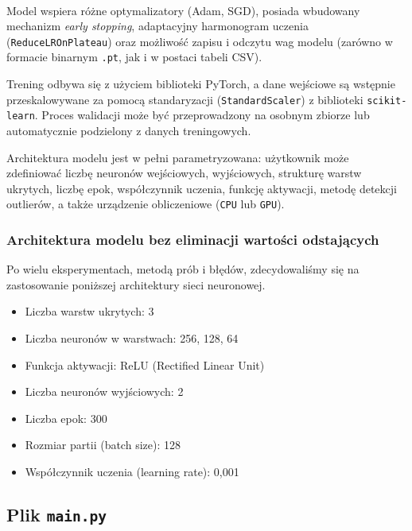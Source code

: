 \documentclass{classrep}
\begin{document}
\paragraph{}
Model wspiera różne optymalizatory (Adam, SGD), posiada wbudowany mechanizm \textit{early stopping}, adaptacyjny harmonogram uczenia (\texttt{ReduceLROnPlateau}) oraz możliwość zapisu i odczytu wag modelu (zarówno w formacie binarnym \texttt{.pt}, jak i w postaci tabeli CSV).

Trening odbywa się z użyciem biblioteki PyTorch, a dane wejściowe są wstępnie przeskalowywane za pomocą standaryzacji (\texttt{StandardScaler}) z biblioteki \texttt{scikit-learn}. Proces walidacji może być przeprowadzony na osobnym zbiorze lub automatycznie podzielony z danych treningowych.

Architektura modelu jest w pełni parametryzowana: użytkownik może zdefiniować liczbę neuronów wejściowych, wyjściowych, strukturę warstw ukrytych, liczbę epok, współczynnik uczenia, funkcję aktywacji, metodę detekcji outlierów, a także urządzenie obliczeniowe (\texttt{CPU} lub \texttt{GPU}).

\clearpage{}
\subsubsection*{Architektura modelu bez eliminacji wartości odstających}

Po wielu eksperymentach, metodą prób i błędów, zdecydowaliśmy się na zastosowanie poniższej architektury sieci neuronowej.

\begin{itemize}
	\item Liczba warstw ukrytych: 3
	\item Liczba neuronów w warstwach: 256, 128, 64
	\item Funkcja aktywacji: ReLU (Rectified Linear Unit)
	\item Liczba neuronów wyjściowych: 2
	\item Liczba epok: 300
	\item Rozmiar partii (batch size): 128
	\item Współczynnik uczenia (learning rate): 0{,}001
\end{itemize}

\clearpage{}

\subsection{Plik \texttt{main.py}}
\end{document}
